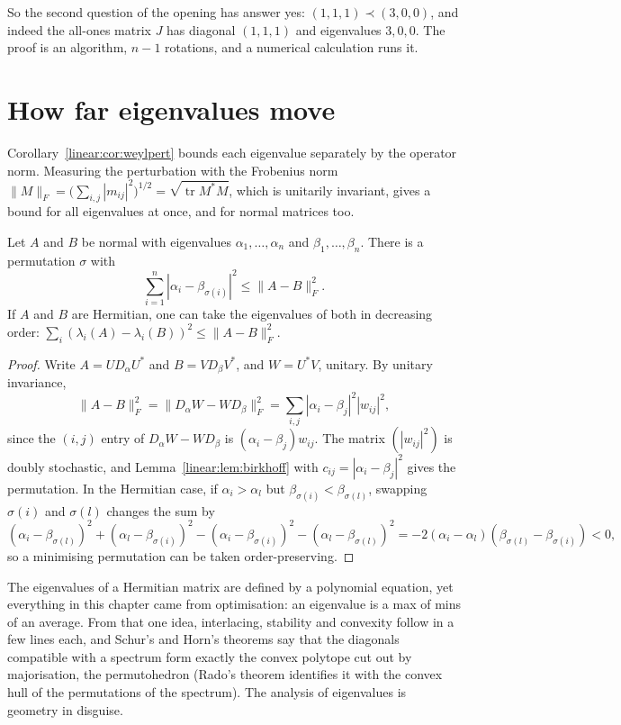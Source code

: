 So the second question of the opening has answer yes: $(1,1,1)\prec(3,0,0)$, and indeed the all-ones matrix $J$ has
diagonal $(1,1,1)$ and eigenvalues $3,0,0$. The proof is an algorithm, $n-1$ rotations, and a numerical calculation runs it.

\section{How far eigenvalues move}

Corollary~\ref{linear:cor:weylpert} bounds each eigenvalue separately by the operator norm. Measuring the perturbation with the
Frobenius norm $\|M\|_F=\bigl(\sum_{i,j}|m_{ij}|^2\bigr)^{1/2}=\sqrt{\operatorname{tr}M^*M}$, which is unitarily invariant, gives
a bound for all eigenvalues at once, and for normal matrices too.

\begin{theorem}\label{linear:thm:hoffmanwielandt}
Let $A$ and $B$ be normal with eigenvalues $\alpha_1,\dots,\alpha_n$ and $\beta_1,\dots,\beta_n$. There is a permutation $\sigma$
with
\[
\sum_{i=1}^n|\alpha_i-\beta_{\sigma(i)}|^2\le\|A-B\|_F^2.
\]
If $A$ and $B$ are Hermitian, one can take the eigenvalues of both in decreasing order: $\sum_i(\lambda_i(A)-\lambda_i(B))^2
\le\|A-B\|_F^2$.
\end{theorem}
\begin{proof}
Write $A=UD_\alpha U^*$ and $B=VD_\beta V^*$, and $W=U^*V$, unitary. By unitary invariance,
\[
\|A-B\|_F^2=\|D_\alpha W-WD_\beta\|_F^2=\sum_{i,j}|\alpha_i-\beta_j|^2|w_{ij}|^2,
\]
since the $(i,j)$ entry of $D_\alpha W-WD_\beta$ is $(\alpha_i-\beta_j)w_{ij}$. The matrix $(|w_{ij}|^2)$ is doubly stochastic,
and Lemma~\ref{linear:lem:birkhoff} with $c_{ij}=|\alpha_i-\beta_j|^2$ gives the permutation. In the Hermitian case, if
$\alpha_i>\alpha_l$ but $\beta_{\sigma(i)}<\beta_{\sigma(l)}$, swapping $\sigma(i)$ and $\sigma(l)$ changes the sum by
\[
(\alpha_i-\beta_{\sigma(l)})^2+(\alpha_l-\beta_{\sigma(i)})^2-(\alpha_i-\beta_{\sigma(i)})^2-(\alpha_l-\beta_{\sigma(l)})^2
=-2(\alpha_i-\alpha_l)(\beta_{\sigma(l)}-\beta_{\sigma(i)})<0,
\]
so a minimising permutation can be taken order-preserving.
\end{proof}

\begin{beauty}
The eigenvalues of a Hermitian matrix are defined by a polynomial equation, yet everything in this chapter came from
optimisation: an eigenvalue is a max of mins of an average. From that one idea, interlacing, stability and convexity follow
in a few lines each, and Schur's and Horn's theorems say that the diagonals compatible with a spectrum form exactly the
convex polytope cut out by majorisation, the permutohedron (Rado's theorem identifies it with the convex hull of the
permutations of the spectrum). The analysis of eigenvalues is geometry in disguise.
\end{beauty}

